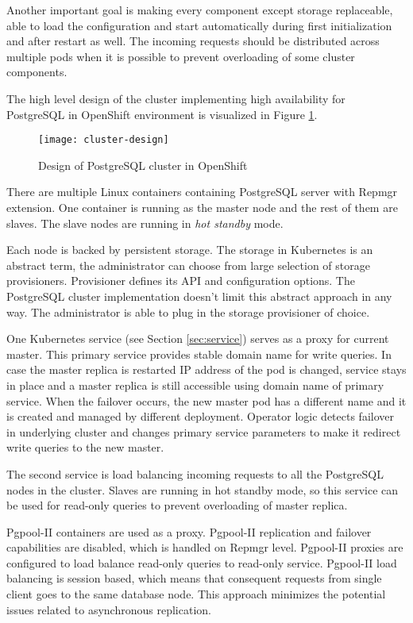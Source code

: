 \documentclass[
  digital, %
  twoside, %
  table,   %
  lof,     %
  lot,     %
]{fithesis3}
\begin{document}
Another important goal is making every component except storage replaceable, able to load the configuration and start automatically during first initialization and after restart as well. The incoming requests should be distributed across multiple pods when it is possible to prevent overloading of some cluster components.

The high level design of the cluster implementing high availability for PostgreSQL in OpenShift environment is visualized in Figure \ref{fig:cluster_design}.

\begin{figure}[H]
\caption{Design of PostgreSQL cluster in OpenShift}
\centering
\texttt{[image: cluster-design]}
\label{fig:cluster_design}
\end{figure}

There are multiple Linux containers containing PostgreSQL server with Repmgr extension. One container is running as the master node and the rest of them are slaves. The slave nodes are running in \textit{hot standby} mode.

Each node is backed by persistent storage. The storage in Kubernetes is an abstract term, the administrator can choose from large selection of storage provisioners. Provisioner defines its API and configuration options.  The PostgreSQL cluster implementation doesn't limit this abstract approach in any way. The administrator is able to plug in the storage provisioner of choice.

One Kubernetes service (see Section \ref{sec:service}) serves as a proxy for current master. This primary service provides stable domain name for write queries. In case the master replica is restarted IP address of the pod is changed, service stays in place and a master replica is still accessible using domain name of primary service. When the failover occurs, the new master pod has a different name and it is created and managed by different deployment. Operator logic detects failover in underlying cluster and changes primary service parameters to make it redirect write queries to the new master.

The second service is load balancing incoming requests to all the PostgreSQL nodes in the cluster. Slaves are running in hot standby mode, so this service can be used for read-only queries to prevent overloading of master replica.

Pgpool-II containers are used as a proxy. Pgpool-II replication and failover capabilities are disabled, which is handled on Repmgr level. Pgpool-II proxies are configured to load balance read-only queries to  read-only service. Pgpool-II load balancing is session based, which means that consequent requests from single client goes to the same database node. This approach minimizes the potential issues related to asynchronous replication.
\end{document}
